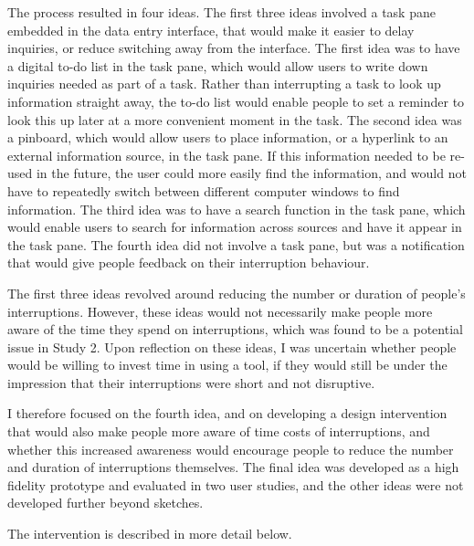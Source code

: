 The process resulted in four ideas. The first three ideas involved a task pane embedded in the data entry interface, that would make it easier to delay inquiries, or reduce switching away from the interface. The first idea was to have a digital to-do list in the task pane, which would allow users to write down inquiries needed as part of a task. Rather than interrupting a task to look up information straight away, the to-do list would enable people to set a reminder to look this up later at a more convenient moment in the task. The second idea was a pinboard, which would allow users to place information, or a hyperlink to an external information source, in the task pane. If this information needed to be re-used in the future, the user could more easily find the information, and would not have to repeatedly switch between different computer windows to find information. The third idea was to have a search function in the task pane, which would enable users to search for information across sources and have it appear in the task pane. The fourth idea did not involve a task pane, but was a notification that would give people feedback on their interruption behaviour.

The first three ideas revolved around reducing the number or duration of people’s interruptions. However, these ideas would not necessarily make people more aware of the time they spend on interruptions, which was found to be a potential issue in Study 2. Upon reflection on these ideas, I was uncertain whether people would be willing to invest time in using a tool, if they would still be under the impression that their interruptions were short and not disruptive. 

I therefore focused on the fourth idea, and on developing a design intervention that would also make people more aware of time costs of interruptions, and whether this increased awareness would encourage people to reduce the number and duration of interruptions themselves. The final idea was developed as a high fidelity prototype and evaluated in two user studies, and the other ideas were not developed further beyond sketches. 

The intervention is described in more detail below.

